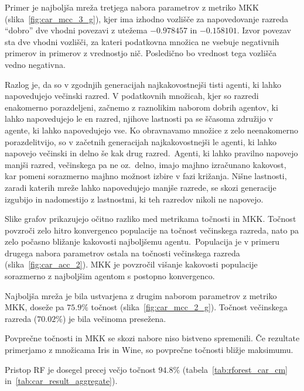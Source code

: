 \documentclass[a4paper,12pt,openright]{book}
\begin{document}
    Primer je najboljša mreža tretjega nabora parametrov z metriko MKK (slika~\ref{fig:car_mcc_3_g}), kjer ima izhodno
    vozlišče za napovedovanje razreda \enquote{dobro} dve vhodni povezavi z utežema $-0.978457$ in $-0.158101$.
    Izvor povezav sta dve vhodni vozlišči, za kateri podatkovna množica ne vsebuje negativnih primerov in primerov z vrednostjo nič.
    Posledično bo vrednost tega vozlišča vedno negativna.

    Razlog je, da so v zgodnjih generacijah najkakovostnejši tisti agenti, ki lahko napovedujejo večinski razred.
    V podatkovnih množicah, kjer so razredi enakomerno porazdeljeni, začnemo z raznolikim naborom dobrih agentov, ki lahko napovedujejo
    le en razred, njihove lastnosti pa se ščasoma združijo v agente, ki lahko napovedujejo vse.
    Ko obravnavamo množice z zelo neenakomerno porazdelitvijo, so v začetnih generacijah najkakovostnejši le agenti, ki
    lahko napovejo večinski in delno še kak drug razred.\ Agenti, ki lahko pravilno napovejo manjši razred, večinskega pa ne oz.\ delno,
    imajo majhno izračunano kakovost, kar pomeni sorazmerno majhno možnost izbire v fazi križanja.
    Nišne lastnosti, zaradi katerih mreže lahko napovedujejo manjše razrede, se skozi generacije izgubijo in nadomestijo z
    lastnostmi, ki teh razredov nikoli ne napovejo.

    Slike grafov prikazujejo očitno razliko med metrikama točnosti in MKK.
    Točnost povzroči zelo hitro konvergenco populacije na točnost večinskega razreda, nato pa zelo počasno bližanje kakovosti
    najboljšemu agentu.\ Populacija je v primeru drugega nabora parametrov ostala na točnosti večinskega razreda (slika~\ref{fig:car_acc_2}).
    MKK je povzročil višanje kakovosti populacije sorazmerno z najboljšim agentom s postopno konvergenco.

    Najboljša mreža je bila ustvarjena z drugim naborom parametrov z metriko MKK, doseže pa $75.9\%$ točnost (slika~\ref{fig:car_mcc_2_g}).
    Točnost večinskega razreda ($70.02\%$) je bila večinoma presežena.

    Povprečne točnosti in MKK se skozi nabore niso bistveno spremenili.
    Če rezultate primerjamo z množicama Iris in Wine, so povprečne točnosti bližje maksimumu.

    Pristop RF je dosegel precej večjo točnost $94.8\%$ (tabela~\ref{tab:rforest_car_cm} in~\ref{tab:car_result_aggregate}).
\end{document}
